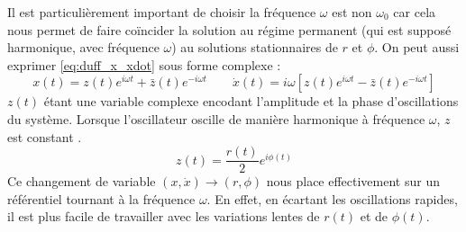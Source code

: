 Il est particulièrement important de choisir la fréquence $\omega$ est non $\omega_0$ car cela nous permet de faire coïncider la solution au régime permanent (qui est supposé harmonique, avec fréquence $\omega$)
au solutions stationnaires de $r$ et $\phi$. On peut aussi exprimer \eqref{eq:duff_x_xdot} sous forme complexe :
\begin{equation}
    x(t) = z(t)e^{i\omega t} + \bar{z}(t) e^{-i\omega t}
    \qquad 
    \dot{x}(t) = i\omega \left[ z(t)e^{i\omega t} - \bar{z}(t) e^{-i\omega t} \right]
    \label{eq:duff_x_xdot_exp}
\end{equation}
%
$z(t)$ étant une variable complexe encodant l'amplitude et la phase d'oscillations du système. Lorsque l'oscillateur oscille de manière harmonique à fréquence $\omega$, $z$ est constant \cite{pistolesi_duffing_nodate}.
\[ z(t) = \frac{r(t)}{2}e^{i\phi(t)} \]
%
Ce changement de variable $(x, \dot{x}) \to (r, \phi)$ nous place effectivement sur un référentiel tournant à la fréquence $\omega$. 
En effet, en écartant les oscillations rapides, il est plus facile de travailler avec les variations lentes de $r(t)$ et de $\phi(t)$. 

